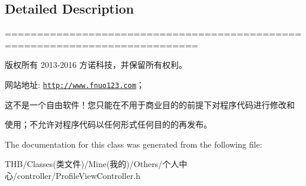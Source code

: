 \subsection{Detailed Description}
============================================================================

版权所有 2013-\/2016 方诺科技，并保留所有权利。

网站地址\+: \href{http://www.fnuo123.com}{\tt http\+://www.\+fnuo123.\+com}； 



这不是一个自由软件！您只能在不用于商业目的的前提下对程序代码进行修改和

使用；不允许对程序代码以任何形式任何目的的再发布。 

 

The documentation for this class was generated from the following file\+:\begin{DoxyCompactItemize}
\item 
T\+H\+B/\+Classes(类文件)/\+Mine(我的)/\+Others/个人中心/controller/Profile\+View\+Controller.\+h\end{DoxyCompactItemize}
